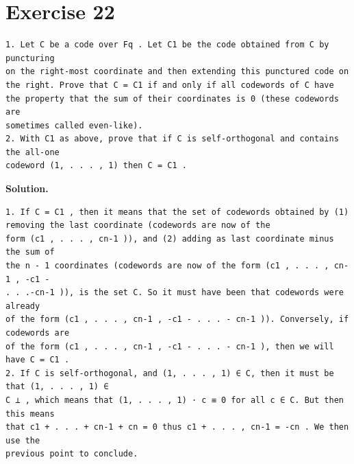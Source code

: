 \documentclass[11pt]{article}
\begin{document}
\section*{Exercise 22}
\begin{exercisebox}
\begin{Verbatim}[fontsize=\small]
1. Let C be a code over Fq . Let C1 be the code obtained from C by puncturing
on the right-most coordinate and then extending this punctured code on
the right. Prove that C = C1 if and only if all codewords of C have
the property that the sum of their coordinates is 0 (these codewords are
sometimes called even-like).
2. With C1 as above, prove that if C is self-orthogonal and contains the all-one
codeword (1, . . . , 1) then C = C1 .
\end{Verbatim}
\end{exercisebox}
\begin{solutionbox}
\textbf{Solution.}

\begin{Verbatim}[fontsize=\small]
1. If C = C1 , then it means that the set of codewords obtained by (1) removing the last coordinate (codewords are now of the
form (c1 , . . . , cn-1 )), and (2) adding as last coordinate minus the sum of
the n - 1 coordinates (codewords are now of the form (c1 , . . . , cn-1 , -c1 -
. . .-cn-1 )), is the set C. So it must have been that codewords were already
of the form (c1 , . . . , cn-1 , -c1 - . . . - cn-1 )). Conversely, if codewords are
of the form (c1 , . . . , cn-1 , -c1 - . . . - cn-1 ), then we will have C = C1 .
2. If C is self-orthogonal, and (1, . . . , 1) ∈ C, then it must be that (1, . . . , 1) ∈
C ⊥ , which means that (1, . . . , 1) · c ≡ 0 for all c ∈ C. But then this means
that c1 + . . . + cn-1 + cn = 0 thus c1 + . . . , cn-1 = -cn . We then use the
previous point to conclude.
\end{Verbatim}
\end{solutionbox}
\end{document}
